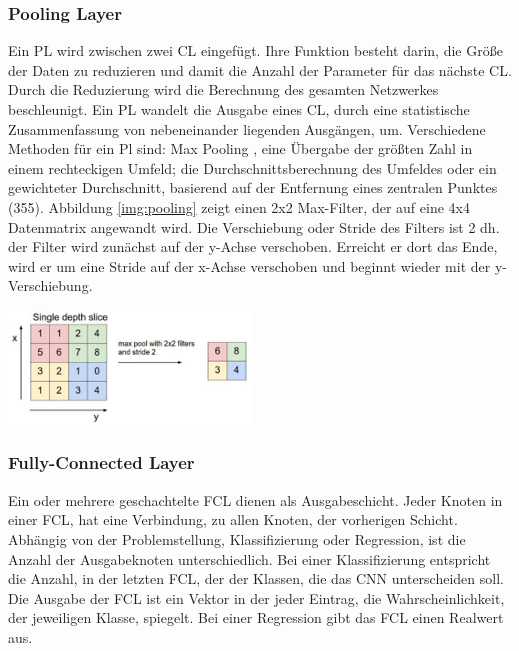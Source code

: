 \documentclass[twosided,a4,10pt]{article}
\begin{document}
\begin{multicols}{2}
		\subsubsection*{Pooling Layer}
		Ein PL wird zwischen zwei CL eingefügt. Ihre Funktion besteht darin, die Größe der Daten zu reduzieren und damit die Anzahl der Parameter für das nächste CL. Durch die Reduzierung wird die Berechnung des gesamten Netzwerkes beschleunigt. \cite{karpathy}\newline Ein PL wandelt die Ausgabe eines CL, durch eine statistische Zusammenfassung von nebeneinander liegenden Ausgängen, um. Verschiedene Methoden für ein Pl sind: Max Pooling \cite{zhou}, eine Übergabe der größten Zahl in einem rechteckigen Umfeld; die Durchschnittsberechnung des Umfeldes oder ein gewichteter Durchschnitt, basierend auf der Entfernung eines zentralen Punktes \cite{goodfellow}(355).\newline
		Abbildung \ref{img:pooling} zeigt einen 2x2 Max-Filter, der auf eine 4x4 Datenmatrix angewandt wird. Die Verschiebung oder Stride des Filters ist 2 dh. der Filter wird zunächst auf der y-Achse verschoben. Erreicht er dort das Ende, wird er um eine Stride auf der x-Achse verschoben und beginnt wieder mit der y-Verschiebung.\newline\\
		\begin{minipage}{0.4\textwidth}
			\centering
			\includegraphics{img/pooling.png}
			\label{img:pooling}
		\end{minipage}\newline
		\subsubsection*{Fully-Connected Layer}
		Ein oder mehrere geschachtelte FCL dienen als Ausgabeschicht. Jeder Knoten in einer FCL, hat eine Verbindung, zu allen Knoten, der vorherigen Schicht. Abhängig von der Problemstellung, Klassifizierung oder Regression, ist die Anzahl der Ausgabeknoten unterschiedlich. Bei einer Klassifizierung entspricht die Anzahl, in der letzten FCL, der der Klassen, die das CNN unterscheiden soll. Die Ausgabe der FCL ist ein Vektor in der jeder Eintrag, die Wahrscheinlichkeit, der jeweiligen Klasse, spiegelt. Bei einer Regression gibt das FCL einen Realwert aus. \cite{karpathy}

\end{multicols}
\end{document}
